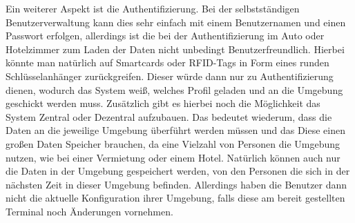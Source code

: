 Ein weiterer Aspekt ist die Authentifizierung. Bei der selbstständigen Benutzerverwaltung kann dies sehr einfach mit einem Benutzernamen und einen Passwort erfolgen, allerdings ist die bei der Authentifizierung im Auto oder Hotelzimmer zum Laden der Daten nicht unbedingt Benutzerfreundlich. Hierbei könnte man natürlich auf Smartcards oder RFID-Tags in Form eines runden Schlüsselanhänger zurückgreifen. Dieser würde dann nur zu Authentifizierung dienen, wodurch das System weiß, welches Profil geladen und an die Umgebung geschickt werden muss. Zusätzlich gibt es hierbei noch die Möglichkeit das System Zentral oder Dezentral aufzubauen. Das bedeutet wiederum, dass die Daten an die jeweilige Umgebung überführt werden müssen und das Diese einen großen Daten Speicher brauchen, da eine Vielzahl von Personen die Umgebung nutzen, wie bei einer Vermietung oder einem Hotel. Natürlich können auch nur die Daten in der Umgebung gespeichert werden, von den Personen die sich in der nächsten Zeit in dieser Umgebung befinden. Allerdings haben die Benutzer dann nicht die aktuelle Konfiguration ihrer Umgebung, falls diese am bereit gestellten Terminal noch Änderungen vornehmen.  

